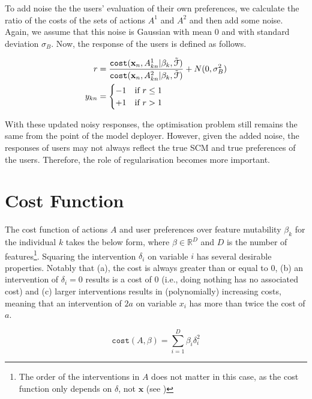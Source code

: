 To add noise the the users' evaluation of their own preferences, we calculate the ratio of the costs of the sets of actions $A^1$ and $A^2$ and then add some noise. Again, we assume that this noise is Gaussian with mean 0 and with standard deviation $\sigma_B$. Now, the response of the users is defined as follows.

\begin{align}
	r & = \frac{\operatorname*{\texttt{cost}}(\mathbf{x}_n, A^1_{kn} | \beta_k, \tilde{\mathcal{F}})}{\operatorname*{\texttt{cost}}(\mathbf{x}_n, A^2_{kn} | \beta_k, \tilde{\mathcal{F}})} + N(0, \sigma^2_B) \\ \nonumber
	y_{kn} & = \begin{cases}
			-1 & \text{if } r \leq 1 \\
			+1 & \text{if } r > 1 \\
			\end{cases}
\end{align}

With these updated noisy responses, the optimisation problem still remains the same from the point of the model deployer. However, given the added noise, the responses of users may not always reflect the true SCM and true preferences of the users. Therefore, the role of regularisation becomes more important.

\section{Cost Function}

The cost function of actions $A$ and user preferences over feature mutability $\beta_k$ for the individual $k$ takes the below form, where $\beta \in \mathbb{R}^D$ and $D$ is the number of features\footnote{The order of the interventions in $A$ does not matter in this case, as the cost function only depends on $\delta$, not $\mathbf{x}$ (see )}. Squaring the intervention $\delta_i$ on variable $i$ has several desirable properties. Notably that (a), the cost is always greater than or equal to 0, (b) an intervention of $\delta_i=0$ results is a cost of 0 (i.e., doing nothing has no associated cost) and (c) larger interventions results in (polynomially) increasing costs, meaning that an intervention of $2a$ on variable $x_i$ has more than twice the cost of $a$.

\begin{equation}
	\texttt{cost}(A, \beta) = \sum_{i=1}^D \beta_i \delta^2_i
\end{equation}
